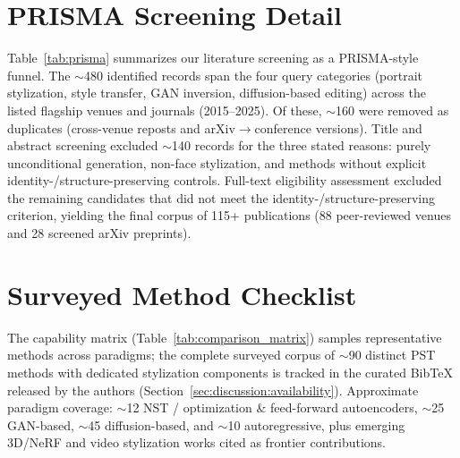 \documentclass[journal]{IEEEtran}
\begin{document}

\appendix
\section{PRISMA Screening Detail}
\label{app:prisma}
Table~\ref{tab:prisma} summarizes our literature screening as a PRISMA-style funnel. The $\sim$480 identified records span the four query categories (portrait stylization, style transfer, GAN inversion, diffusion-based editing) across the listed flagship venues and journals (2015--2025). Of these, $\sim$160 were removed as duplicates (cross-venue reposts and arXiv$\to$conference versions). Title and abstract screening excluded $\sim$140 records for the three stated reasons: purely unconditional generation, non-face stylization, and methods without explicit identity-/structure-preserving controls. Full-text eligibility assessment excluded the remaining candidates that did not meet the identity-/structure-preserving criterion, yielding the final corpus of 115+ publications (88 peer-reviewed venues and 28 screened arXiv preprints).

\section{Surveyed Method Checklist}
\label{app:checklist}
The capability matrix (Table~\ref{tab:comparison_matrix}) samples representative methods across paradigms; the complete surveyed corpus of $\sim$90 distinct PST methods with dedicated stylization components is tracked in the curated BibTeX released by the authors (Section~\ref{sec:discussion:availability}). Approximate paradigm coverage: $\sim$12 NST / optimization \& feed-forward autoencoders, $\sim$25 GAN-based, $\sim$45 diffusion-based, and $\sim$10 autoregressive, plus emerging 3D/NeRF and video stylization works cited as frontier contributions.




\end{document}
